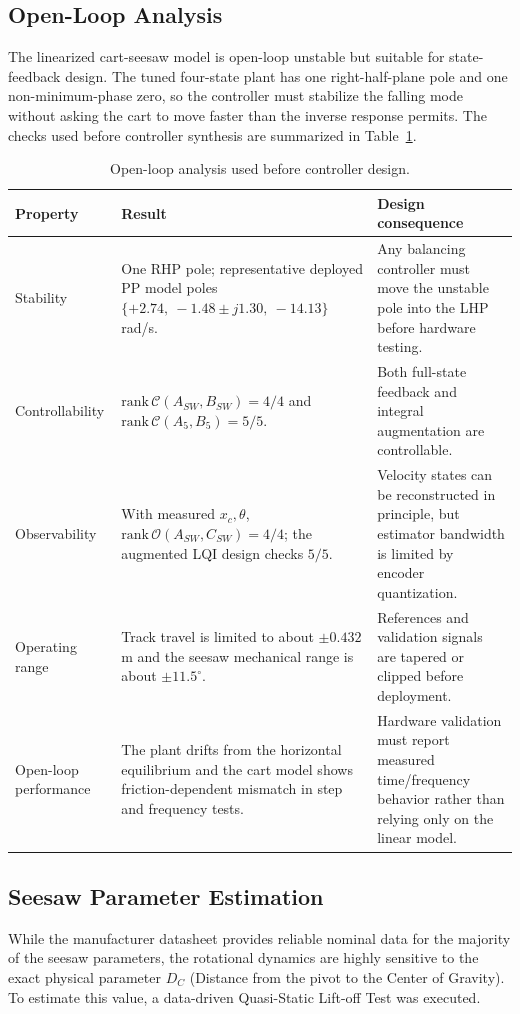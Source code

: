 \documentclass[11pt,a4paper]{article}
\begin{document}
\subsection{Open-Loop Analysis}\label{sub:seesaw_model_ol_analysis}
The linearized cart-seesaw model is open-loop unstable but suitable for state-feedback design. The tuned four-state plant has one right-half-plane pole and one non-minimum-phase zero, so the controller must stabilize the falling mode without asking the cart to move faster than the inverse response permits. The checks used before controller synthesis are summarized in Table~\ref{table:open_loop_analysis}.

\begin{table}[H]
\centering
\small
\begin{tabular}{|p{8em} p{15em} p{18em}|}
\hline
\rowcolor{bluePoli!40}
\textbf{Property} & \textbf{Result} & \textbf{Design consequence} \T\B \\
\hline \hline
Stability & One RHP pole; representative deployed PP model poles $\{+2.74,\ -1.48\pm j1.30,\ -14.13\}$ rad/s. & Any balancing controller must move the unstable pole into the LHP before hardware testing. \T\B \\
Controllability & $\mathrm{rank}\,\mathcal{C}(A_{SW},B_{SW})=4/4$ and $\mathrm{rank}\,\mathcal{C}(A_5,B_5)=5/5$. & Both full-state feedback and integral augmentation are controllable. \T\B \\
Observability & With measured $x_c,\theta$, $\mathrm{rank}\,\mathcal{O}(A_{SW},C_{SW})=4/4$; the augmented LQI design checks $5/5$. & Velocity states can be reconstructed in principle, but estimator bandwidth is limited by encoder quantization. \T\B \\
Operating range & Track travel is limited to about $\pm0.432$ m and the seesaw mechanical range is about $\pm11.5^\circ$. & References and validation signals are tapered or clipped before deployment. \T\B \\
Open-loop performance & The plant drifts from the horizontal equilibrium and the cart model shows friction-dependent mismatch in step and frequency tests. & Hardware validation must report measured time/frequency behavior rather than relying only on the linear model. \B \\
\hline
\end{tabular}
\caption{Open-loop analysis used before controller design.}
\label{table:open_loop_analysis}
\end{table}

\subsection{Seesaw Parameter Estimation}\label{sub:seesaw_param_estimation}
While the manufacturer datasheet provides reliable nominal data for the majority of the seesaw parameters, the rotational dynamics are highly sensitive to the exact physical parameter $D_C$ (Distance from the pivot to the Center of Gravity). To estimate this value, a data-driven Quasi-Static Lift-off Test was executed.
\end{document}
